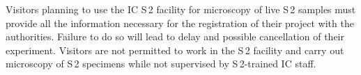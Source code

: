 Visitors planning to use the IC S\,2 facility for microscopy of live S\,2 samples must provide all the information necessary for the registration of their project with the authorities. Failure to do so will lead to delay and possible cancellation of their experiment. Visitors are not permitted to work in the S\,2 facility and carry out microscopy of S\,2 specimens while not supervised by S\,2-trained IC staff.  
